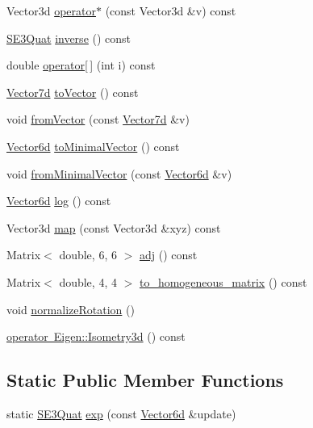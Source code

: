 \begin{DoxyCompactItemize}
\item 
Vector3d \mbox{\hyperlink{classg2o_1_1_s_e3_quat_a7cc4e945656a75d927bd584c1bb4cb76}{operator$\ast$}} (const Vector3d \&v) const
\item 
\mbox{\hyperlink{classg2o_1_1_s_e3_quat}{S\+E3\+Quat}} \mbox{\hyperlink{classg2o_1_1_s_e3_quat_a894d361da0f27b25472b3a274deefed3}{inverse}} () const
\item 
double \mbox{\hyperlink{classg2o_1_1_s_e3_quat_ac5588c5ae47bbe881f8e3e2782539e66}{operator\mbox{[}$\,$\mbox{]}}} (int i) const
\item 
\mbox{\hyperlink{namespaceg2o_a4740ec41130f2ecc628c81f71261c8de}{Vector7d}} \mbox{\hyperlink{classg2o_1_1_s_e3_quat_a59ecabba8306c7ab111d1cc483561f61}{to\+Vector}} () const
\item 
void \mbox{\hyperlink{classg2o_1_1_s_e3_quat_a59aa7dffe9320761ee65bcdfa2bc61fd}{from\+Vector}} (const \mbox{\hyperlink{namespaceg2o_a4740ec41130f2ecc628c81f71261c8de}{Vector7d}} \&v)
\item 
\mbox{\hyperlink{namespaceg2o_a3bc8a4fbac86f158d548be81af2f929b}{Vector6d}} \mbox{\hyperlink{classg2o_1_1_s_e3_quat_a2b5a5177c2d5e6e637019253e9630a08}{to\+Minimal\+Vector}} () const
\item 
void \mbox{\hyperlink{classg2o_1_1_s_e3_quat_a65714851482e99558401d4ea66edb183}{from\+Minimal\+Vector}} (const \mbox{\hyperlink{namespaceg2o_a3bc8a4fbac86f158d548be81af2f929b}{Vector6d}} \&v)
\item 
\mbox{\hyperlink{namespaceg2o_a3bc8a4fbac86f158d548be81af2f929b}{Vector6d}} \mbox{\hyperlink{classg2o_1_1_s_e3_quat_ab19dfa20f3d0ed68f07a81ea90bcfc76}{log}} () const
\item 
Vector3d \mbox{\hyperlink{classg2o_1_1_s_e3_quat_a6b2c679d255e1adc8e734215703cf01c}{map}} (const Vector3d \&xyz) const
\item 
Matrix$<$ double, 6, 6 $>$ \mbox{\hyperlink{classg2o_1_1_s_e3_quat_a5540394ac7f1a61c5e04ceed9c96617a}{adj}} () const
\item 
Matrix$<$ double, 4, 4 $>$ \mbox{\hyperlink{classg2o_1_1_s_e3_quat_a88de9de9db852e2a0414bcd2afdc0fda}{to\+\_\+homogeneous\+\_\+matrix}} () const
\item 
void \mbox{\hyperlink{classg2o_1_1_s_e3_quat_a0e2c54c6dfdaa71b677556a9d8e4e88a}{normalize\+Rotation}} ()
\item 
\mbox{\hyperlink{classg2o_1_1_s_e3_quat_ae7aa654ff10b9f4e2fa0b5583526f026}{operator Eigen\+::\+Isometry3d}} () const
\end{DoxyCompactItemize}
\subsection*{Static Public Member Functions}
\begin{DoxyCompactItemize}
\item 
static \mbox{\hyperlink{classg2o_1_1_s_e3_quat}{S\+E3\+Quat}} \mbox{\hyperlink{classg2o_1_1_s_e3_quat_a374a05b202889d09d5a3a25e0fb6c103}{exp}} (const \mbox{\hyperlink{namespaceg2o_a3bc8a4fbac86f158d548be81af2f929b}{Vector6d}} \&update)
\end{DoxyCompactItemize}
